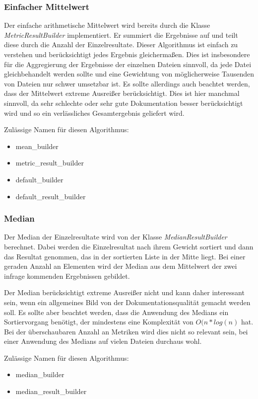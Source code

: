 \subsubsection{Einfacher Mittelwert}
Der einfache arithmetische Mittelwert wird bereits durch die Klasse \textit{MetricResultBuilder} implementiert. Er summiert die Ergebnisse auf und teilt diese durch die Anzahl der Einzelresultate. Dieser Algorithmus ist einfach zu verstehen und berücksichtigt jedes Ergebnis gleichermaßen. Dies ist insbesondere für die Aggregierung der Ergebnisse der einzelnen Dateien sinnvoll, da jede Datei gleichbehandelt werden sollte und eine Gewichtung von möglicherweise Tausenden von Dateien nur schwer umsetzbar ist. Es sollte allerdings auch beachtet werden, dass der Mittelwert extreme Ausreißer berücksichtigt. Dies ist hier manchmal sinnvoll, da sehr schlechte oder sehr gute Dokumentation besser berücksichtigt wird und so ein verlässliches Gesamtergebnis geliefert wird.

Zulässige Namen für diesen Algorithmus:
\begin{itemize}
\item mean\_builder
\item metric\_result\_builder
\item default\_builder
\item default\_result\_builder
\end{itemize}

\subsubsection{Median}
Der Median der Einzelresultate wird von der Klasse \textit{MedianResultBuilder} berechnet. Dabei werden die Einzelresultat nach ihrem Gewicht sortiert und dann das Resultat genommen, das in der sortierten Liste in der Mitte liegt. Bei einer geraden Anzahl an Elementen wird der Median aus dem Mittelwert der zwei infrage kommenden Ergebnissen gebildet. 

Der Median berücksichtigt extreme Ausreißer nicht und kann daher interessant sein, wenn ein allgemeines Bild von der Dokumentationsqualität gemacht werden soll. Es sollte aber beachtet werden, dass die Anwendung des Medians ein Sortiervorgang benötigt, der mindestens eine Komplexität von $O(n*log(n)$ hat. Bei der überschaubaren Anzahl an Metriken wird dies nicht so relevant sein, bei einer Anwendung des Medians auf vielen Dateien durchaus wohl.

Zulässige Namen für diesen Algorithmus:
\begin{itemize}
\item median\_builder
\item median\_result\_builder
\end{itemize}

